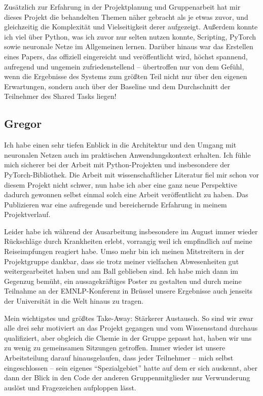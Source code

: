 \documentclass[11pt,a4paper]{article}
\begin{document}
Zusätzlich zur Erfahrung in der Projektplanung und Gruppenarbeit hat mir dieses Projekt die behandelten Themen näher gebracht als je etwas zuvor, und gleichzeitig die Komplexität und Vielseitigkeit derer aufgezeigt. Außerdem konnte ich viel über Python, was ich zuvor nur selten nutzen konnte, Scripting, PyTorch sowie neuronale Netze im Allgemeinen lernen. Darüber hinaus war das Erstellen eines Papers, das offiziell eingereicht und veröffentlicht wird, höchst spannend, aufregend und ungemein zufriedenstellend -- übertroffen nur von dem Gefühl, wenn die Ergebnisse des Systems zum größten Teil nicht nur über den eigenen Erwartungen, sondern auch über der Baseline und dem Durchschnitt der Teilnehmer des Shared Tasks liegen!

\subsection{Gregor}
Ich habe einen sehr tiefen Enblick in die Architektur und den Umgang mit neuronalen Netzen auch im praktischen Anwendungskontext erhalten. Ich fühle mich sicherer bei der Arbeit mit Python-Projekten und insbesondere der PyTorch-Bibliothek. Die Arbeit mit wissenschaftlicher Literatur fiel mir schon vor diesem Projekt nicht schwer, nun habe ich aber eine ganz neue Perspektive dadurch gewonnen selbst einmal solch eine Arbeit veröffentlicht zu haben. Das Publizieren war eine aufregende und bereichernde Erfahrung in meinem Projektverlauf.

Leider habe ich während der Ausarbeitung insbesondere im August immer wieder Rückschläge durch Krankheiten erlebt, vorrangig weil ich empfindlich auf meine Reiseimpfungen reagiert habe. Umso mehr bin ich meinen Mitstreitern in der Projektgruppe dankbar, dass sie trotz meiner vielfachen Abwesenheiten gut weitergearbeitet haben und am Ball geblieben sind. Ich habe mich dann im Gegenzug bemüht, ein aussagekräftiges Poster zu gestalten und durch meine Teilnahme an der EMNLP-Konferenz in Brüssel unsere Ergebnisse auch jenseits der Universität in die Welt hinaus zu tragen.

Mein wichtigstes und größtes Take-Away: Stärkerer Austausch. So sind wir zwar alle drei sehr motiviert an das Projekt gegangen und vom Wissensstand durchaus qualifiziert, aber obgleich die Chemie in der Gruppe gepasst hat, haben wir uns zu wenig zu gemeinsamen Sitzungen getroffen. Immer wieder ist unsere Arbeitsteilung darauf hinausgelaufen, dass jeder Teilnehmer -- mich selbst eingeschlossen -- sein eigenes \enquote{Spezialgebiet} hatte auf dem er sich auskennt, aber dann der Blick in den Code der anderen Gruppenmitglieder nur Verwunderung auslöst und Fragezeichen aufploppen lässt.
\end{document}
